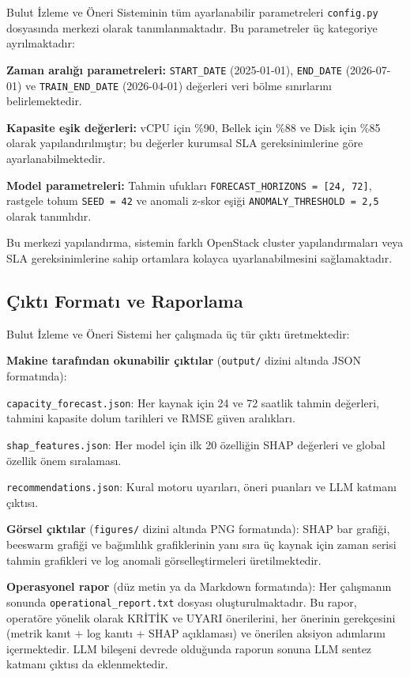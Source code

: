 Bulut İzleme ve Öneri Sisteminin tüm ayarlanabilir parametreleri \texttt{config.py} dosyasında merkezi olarak tanımlanmaktadır.
Bu parametreler üç kategoriye ayrılmaktadır:

\begin{maddelendir}[label=--]
    \item \textbf{Zaman aralığı parametreleri:} \texttt{START\_DATE} (2025-01-01), \texttt{END\_DATE} (2026-07-01) ve \texttt{TRAIN\_END\_DATE} (2026-04-01) değerleri veri bölme sınırlarını belirlemektedir.
    \item \textbf{Kapasite eşik değerleri:} vCPU için \%90, Bellek için \%88 ve Disk için \%85 olarak yapılandırılmıştır; bu değerler kurumsal SLA gereksinimlerine göre ayarlanabilmektedir.
    \item \textbf{Model parametreleri:} Tahmin ufukları \texttt{FORECAST\_HORIZONS = [24, 72]}, rastgele tohum \texttt{SEED = 42} ve anomali z-skor eşiği \texttt{ANOMALY\_THRESHOLD = 2{,}5} olarak tanımlıdır.
\end{maddelendir}

Bu merkezi yapılandırma, sistemin farklı OpenStack cluster yapılandırmaları veya SLA gereksinimlerine sahip ortamlara kolayca uyarlanabilmesini sağlamaktadır.

\subsection{Çıktı Formatı ve Raporlama}

Bulut İzleme ve Öneri Sistemi her çalışmada üç tür çıktı üretmektedir:

\textbf{Makine tarafından okunabilir çıktılar} (\texttt{output/} dizini altında JSON formatında):
\begin{maddelendir}[label=--]
    \item \texttt{capacity\_forecast.json}: Her kaynak için 24 ve 72 saatlik tahmin değerleri, tahmini kapasite dolum tarihleri ve RMSE güven aralıkları.
    \item \texttt{shap\_features.json}: Her model için ilk 20 özelliğin SHAP değerleri ve global özellik önem sıralaması.
    \item \texttt{recommendations.json}: Kural motoru uyarıları, öneri puanları ve LLM katmanı çıktısı.
\end{maddelendir}

\textbf{Görsel çıktılar} (\texttt{figures/} dizini altında PNG formatında):
SHAP bar grafiği, beeswarm grafiği ve bağımlılık grafiklerinin yanı sıra üç kaynak için zaman serisi tahmin grafikleri ve log anomali görselleştirmeleri üretilmektedir.

\textbf{Operasyonel rapor} (düz metin ya da Markdown formatında):
Her çalışmanın sonunda \texttt{operational\_report.txt} dosyası oluşturulmaktadır.
Bu rapor, operatöre yönelik olarak KRİTİK ve UYARI önerilerini, her önerinin gerekçesini (metrik kanıt + log kanıtı + SHAP açıklaması) ve önerilen aksiyon adımlarını içermektedir.
LLM bileşeni devrede olduğunda raporun sonuna LLM sentez katmanı çıktısı da eklenmektedir.
